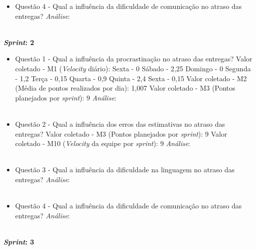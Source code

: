 \begin{apendicesenv}
\begin{itemize}
	  \item Questão 4 - Qual a influência da dificuldade de comunicação no atraso das entregas?
	    \subitem \textit{Análise}:
	  \\
	  \\
	  
	\end{itemize}
	    \vfill
	    \pagebreak
	\textbf{\textit{Sprint}: 2}
	
	\begin{itemize}
	  
	  \item Questão 1 - Qual a influência da procrastinação no atraso das entregas?
	    \subitem Valor coletado - M1 (\textit{Velocity} diário):
	      \subsubitem Sexta - 0
	      \subsubitem Sábado - 2,25
	      \subsubitem Domingo - 0
	      \subsubitem Segunda - 1,2
	      \subsubitem Terça - 0,15
	      \subsubitem Quarta - 0,9
	      \subsubitem Quinta - 2,4
	      \subsubitem Sexta - 0,15
	    \subitem Valor coletado - M2 (Média de pontos realizados por dia): 1,007
	    \subitem Valor coletado - M3 (Pontos planejados por \textit{sprint}): 9
	    \subitem \textit{Análise}:
	    \\
	    \\

	  \item Questão 2 - Qual a influência dos erros das estimativas no atraso das entregas? 
	    \subitem Valor coletado - M3 (Pontos planejados por \textit{sprint}): 9
	    \subitem Valor coletado - M10 (\textit{Velocity} da equipe por \textit{sprint}): 9
	    \subitem \textit{Análise}:
	    \\
	    \\
	    
	  \item Questão 3 - Qual a influência da dificuldade na linguagem no atraso das entregas?
	    \subitem \textit{Análise}:
	  \\
	  \\
	  
	  \item Questão 4 - Qual a influência da dificuldade de comunicação no atraso das entregas?
	    \subitem \textit{Análise}:
	  \\
	  \\
	  
	\end{itemize}
	    \vfill
	    \pagebreak
	\textbf{\textit{Sprint}: 3}
	
	\begin{itemize}
	  

\end{itemize}
\end{apendicesenv}
